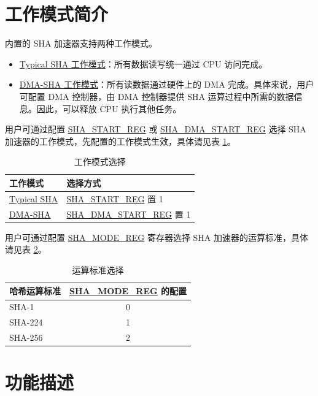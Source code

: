 \documentclass[main\_\_CN.tex]{subfiles}
\begin{document}
\section{工作模式简介}
\chipname{} 内置的 SHA 加速器支持两种工作模式。

\begin{itemize}
    \item \hyperref[sec:sha-typical-sha]{Typical SHA 工作模式}：所有数据读写统一通过 CPU 访问完成。
    \item \hyperref[sec:sha-dma-sha]{DMA-SHA 工作模式}：所有读数据通过硬件上的 DMA 完成。具体来说，用户可配置 DMA 控制器，由 DMA 控制器提供 SHA 运算过程中所需的数据信息。因此，可以释放 CPU 执行其他任务。
\end{itemize}    

用户可通过配置 \hyperref[regdesc:SHASTARTREG]{SHA\_START\_REG} 或 \hyperref[regdesc:SHADMASTARTREG]{SHA\_DMA\_START\_REG} 选择 SHA 加速器的工作模式，先配置的工作模式生效，具体请见表 \ref{tab:sha-working-mode}。

\begin{longtable}[c]{ |l|l| }
\caption{工作模式选择}
\label{tab:sha-working-mode}
\\\hline 
\rowcolor{lightgray}
工作模式      & 选择方式\\
    \hline
    \hyperref[sec:sha-typical-sha]{Typical SHA}      &  \hyperref[regdesc:SHASTARTREG]{SHA\_START\_REG} 置 1   \\
    \hline
    \hyperref[sec:sha-dma-sha]{DMA-SHA}           &  \hyperref[regdesc:SHADMASTARTREG]{SHA\_DMA\_START\_REG} 置 1   \\
    \hline
\end{longtable}

\clearpage
用户可通过配置 \hyperref[regdesc:SHAMODEREG]{SHA\_MODE\_REG} 寄存器选择 SHA 加速器的运算标准，具体请见表 \ref{tab:sha-hash-algo-select}。

\begin{longtable}[c]{|l|c|}
\caption{运算标准选择}
\label{tab:sha-hash-algo-select}
\\\hline
\rowcolor{lightgray}
哈希运算标准 & \hyperref[regdesc:SHAMODEREG]{SHA\_MODE\_REG} 的配置\\
    \hline
    SHA-1 & 0\\
    \hline
    SHA-224 & 1\\
    \hline
    SHA-256 & 2\\
    \hline
\end{longtable}

\section{功能描述}
\end{document}
